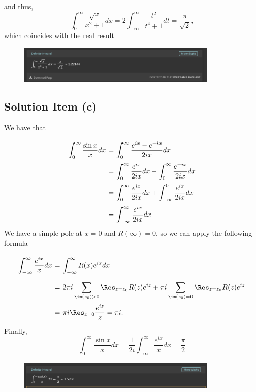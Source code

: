 and thus,
\[ \int_{0}^{\infty} \frac{\sqrt{x}}{x^2+1} dx = 2 \int_{-\infty}^{\infty} \frac{t^2}{t^{4} + 1} dt = \frac{\pi}{\sqrt{2}} ,\]
which coincides with the real result
\begin{figure}[H]
    \centering
    \includegraphics[width=0.85\textwidth]{../pictures/image3.png}
\end{figure}

\subsection*{Solution Item (c)}

We have that
\[ \everymath{\displaystyle}
\arraycolsep=1.8pt\def\arraystretch{2.5}
\begin{array}{rcl}
    \int_{0}^{\infty} \frac{\sin x}{x} dx & = & \int_{0}^{\infty} \frac{e^{ix}- e^{-ix}}{2i x} dx\\
    & = & \int_{0}^{\infty} \frac{e^{ix}}{2i x} dx - \int_{0}^{\infty} \frac{e^{-ix}}{2i x} dx\\
    & = & \int_{0}^{\infty} \frac{e^{ix}}{2i x} dx + \int_{-\infty}^{0} \frac{e^{ix}}{2i x} dx\\
    & = & \int_{-\infty}^{\infty} \frac{e^{ix}}{2i x} dx
\end{array} \]
We have a simple pole at $x = 0$ and $R(\infty) = 0$, so we can apply the following formula
\[ \everymath{\displaystyle}
\arraycolsep=1.8pt\def\arraystretch{2.5}
\begin{array}{rcl}
    \int_{-\infty}^{\infty} \frac{e^{ix}}{x} dx & = & \int_{-\infty}^{\infty} R(x) e^{ix} dx\\
    & = & 2\pi i \sum_{\im(z_0) > 0} \Res_{z = z_0}R(z)e^{iz} + \pi i \sum_{\im(z_0) = 0} \Res_{z = z_0}R(z)e^{iz}\\
    & = & \pi i \Res_{z = 0} \frac{e^{iz}}{z} = \pi i.
\end{array} \]
Finally,
\[ \int_{0}^{\infty} \frac{\sin x}{x} dx = \frac{1}{2i}\int_{-\infty}^{\infty} \frac{e^{ix}}{x} dx = \frac{\pi}{2} \]

\begin{figure}[H]
    \centering
    \includegraphics[width=0.85\textwidth]{../pictures/image4.png}
\end{figure}